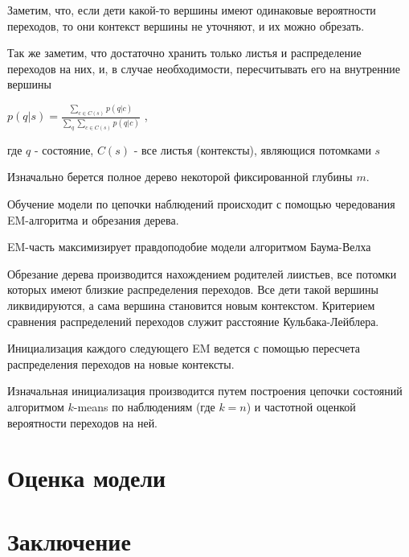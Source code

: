 \documentclass[10pt,a4paper]{article}
\begin{document}
Заметим, что, если дети какой-то вершины имеют одинаковые вероятности переходов, то они контекст вершины не уточняют, и их можно обрезать.

Так же заметим, что достаточно хранить только листья и распределение переходов на них, и, в случае необходимости, пересчитывать его на внутренние вершины

$ p(q|s) = \frac{\sum_{c \in C(s)} {p(q|c)}}{\sum_q\sum_{c \in C(s)} {p(q|c)}} $ ,

где $ q $ - состояние, $ C(s )$ - все листья (контексты), являющися потомками $ s $

Изначально берется полное дерево некоторой фиксированной глубины $m$.

Обучение модели по цепочки наблюдений происходит с помощью чередования EM-алгоритма и обрезания дерева.

EM-часть максимизирует правдоподобие модели алгоритмом Баума-Велха

Обрезание дерева производится нахождением родителей лиистьев, все потомки которых имеют близкие распределения переходов. Все дети такой вершины ликвидируются, а сама вершина становится новым контекстом. Критерием сравнения распределений переходов служит расстояние Кульбака-Лейблера.

Инициализация каждого следующего EM ведется с помощью пересчета распределения переходов на новые контексты.

Изначальная инициализация производится путем построения цепочки состояний алгоритмом $ k $-means по наблюдениям (где $k=n$) и частотной оценкой вероятности переходов на ней.

\section{Оценка модели}

\section{Заключение}



\end{document}
